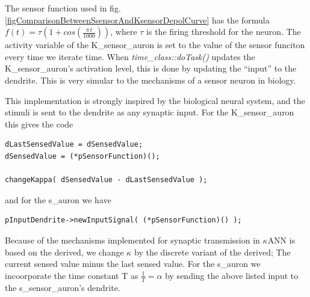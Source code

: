 The sensor function used in fig. \ref{figComparisonBetweenSsensorAndKsensorDepolCurve} has the formula \mbox{$f(t) = \tau (1 + cos( \frac{\pi \, t}{1000} ))$}, where $\tau$ is the firing threshold for the neuron. 
The activity variable of the K\_sensor\_auron is set to the value of the sensor funciton every time we iterate time. %
When \emph{time\_class::doTask()} updates the K\_sensor\_auron's activation level, this is done by updating the ``input'' to the dendrite.
This is very simular to the mechanisms of a sensor neuron in biology. %

This implementation is strongly inspired by the biological neural system, and the stimuli is sent to the dendrite as any synaptic input.
For the K\_sensor\_auron this gives the code
\begin{lstlisting}
dLastSensedValue = dSensedValue;
dSensedValue = (*pSensorFunction)();

changeKappa( dSensedValue - dLastSensedValue ); 
\end{lstlisting} %
and for the s\_auron we have %
\begin{lstlisting}
pInputDendrite->newInputSignal( (*pSensorFunction)() );  
\end{lstlisting} %


Because of the mechanisms implemented for synaptic transmission in $\kappa$ANN is based on the derived, we change $\kappa$ by the discrete variant of the derived; 
The current sensed value minus the last sensed value.%
For the s\_auron we incoorporate the time constant T as $\frac{1}{T} = \alpha$ %
		by sending the above listed input to the s\_sensor\_auron's dendrite.


